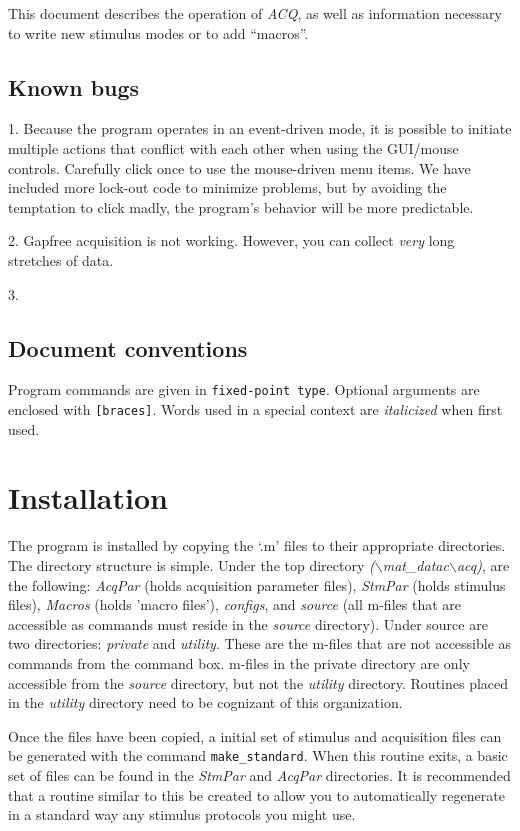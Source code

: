 \documentclass[11pt, letterpaper, titlepage]{paper}
\newcommand{\acq}{\textsl{ACQ}}
\begin{document}
This document describes the operation of \acq, as well as information necessary to write 
new stimulus modes or to add ``macros''.

\subsection{Known bugs}

1. Because the program operates in an event-driven mode, it is 
possible to initiate multiple actions that conflict with each 
other when using the GUI/mouse controls. Carefully click once to 
use the mouse-driven menu items. We have included more 
lock-out code to minimize problems, but by avoiding the temptation 
to click madly, the program's behavior will be more predictable.

2. Gapfree acquisition is not working. However, you can collect \textit{very} long stretches of data. 

3. 


\subsection{Document conventions}
Program commands are given in \texttt{fixed-point type}. Optional arguments are enclosed 
with \texttt{[braces]}. Words used in a special context are \textit{italicized} when 
first used. 

\section{Installation}
The program is installed by copying the `.m' files to their 
appropriate directories. The directory structure is simple. Under 
the top directory 
\textsl{($\backslash$mat\_datac$\backslash$acq)}, are the 
following: \textsl{AcqPar} (holds acquisition parameter files), 
\textsl{StmPar} (holds stimulus files), \textsl{Macros} (holds 
'macro files'), \textsl{configs}, and \textsl{source} (all m-files that are 
accessible as commands must reside in the \textsl{source} directory). Under 
source are two directories: \textsl{private} and \textsl{utility}. 
These are the m-files that are not accessible as commands from the command box. m-files in 
the private directory are only accessible from the \textsl{source} 
directory, but not the \textsl{utility} directory. Routines placed 
in the \textsl{utility} directory need to be cognizant of this 
organization.

Once the files have been copied, a initial set of stimulus and acquisition files can be 
generated with the command \texttt{make\_standard}. When this routine exits, a basic set 
of files can be found in the \textsl{StmPar} and \textsl{AcqPar} directories. It is 
recommended that a routine similar to this be created to allow you to automatically 
regenerate in a standard way any stimulus protocols you might use.
\end{document}
